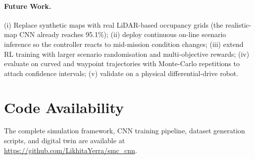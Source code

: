 \documentclass[11pt,a4paper]{article}
\begin{document}
\paragraph{Future Work.}
(i) Replace synthetic maps with real LiDAR-based occupancy grids (the realistic-map CNN
already reaches 95.1\%); (ii) deploy continuous on-line scenario inference so the
controller reacts to mid-mission condition changes; (iii) extend RL training with larger
scenario randomisation and multi-objective rewards; (iv) evaluate on curved and waypoint
trajectories with Monte-Carlo repetitions to attach confidence intervals; (v) validate on
a physical differential-drive robot.

\section*{Code Availability}
The complete simulation framework, CNN training pipeline, dataset generation scripts, and
digital twin are available at
\url{https://github.com/LikhitaYerra/smc_cnn}.
\end{document}
